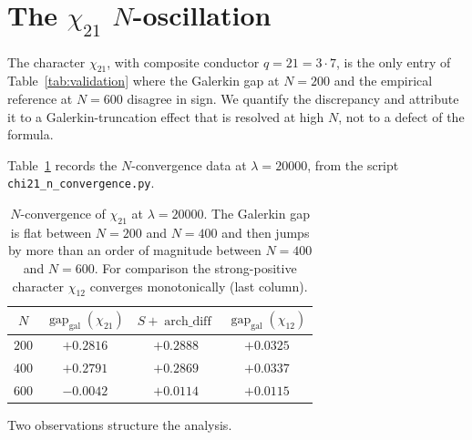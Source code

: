 \documentclass[10pt,twocolumn]{article}
\theoremstyle{definition}
\theoremstyle{remark}
\newcommand{\gap}{\operatorname{gap}}
\newcommand{\chifn}{\chi}
\newcommand{\archdiff}{\operatorname{arch\_diff}}
\begin{document}
\section{\texorpdfstring{The $\chi_{21}$ $N$-oscillation}{The chi21 N-oscillation}}
\label{sec:chi21}

The character $\chifn_{21}$, with composite conductor $q=21=3\cdot 7$,
is the only entry of Table~\ref{tab:validation} where the Galerkin
gap at $N=200$ and the empirical reference at $N=600$ disagree in
sign. We quantify the discrepancy and attribute it to a
Galerkin-truncation effect that is resolved at high $N$, not to a
defect of the formula.

Table~\ref{tab:chi21} records the $N$-convergence data at
$\lambda=20000$, from the script \texttt{chi21\_n\_convergence.py}.

\begin{table}[h]
\caption{$N$-convergence of $\chifn_{21}$ at $\lambda=20000$.
  The Galerkin gap is flat between $N=200$ and $N=400$ and then
  jumps by more than an order of magnitude between $N=400$ and
  $N=600$. For comparison the strong-positive character
  $\chifn_{12}$ converges monotonically (last column).}
\label{tab:chi21}
\centering\small
\begin{tabular}{@{}cccc@{}}
\toprule
$N$ & $\gap_{\mathrm{gal}}(\chifn_{21})$ & $S+\archdiff$ & $\gap_{\mathrm{gal}}(\chifn_{12})$ \\
\midrule
$200$ & $+0.2816$ & $+0.2888$ & $+0.0325$ \\
$400$ & $+0.2791$ & $+0.2869$ & $+0.0337$ \\
$600$ & $-0.0042$ & $+0.0114$ & $+0.0115$ \\
\bottomrule
\end{tabular}
\end{table}

Two observations structure the analysis.
\end{document}
